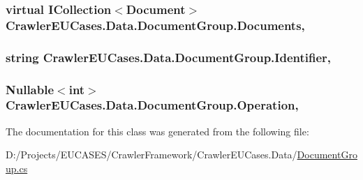 \hypertarget{class_crawler_e_u_cases_1_1_data_1_1_document_group_a02bd75a99fb88ed448675ecd5d416b0f}{
\subsubsection[{Documents}]{\setlength{\rightskip}{0pt plus 5cm}virtual I\-Collection$<${\bf Document}$>$ Crawler\-E\-U\-Cases.\-Data.\-Document\-Group.\-Documents\hspace{0.3cm}{\ttfamily [get]}, {\ttfamily [set]}}}\label{class_crawler_e_u_cases_1_1_data_1_1_document_group_a02bd75a99fb88ed448675ecd5d416b0f}
\hypertarget{class_crawler_e_u_cases_1_1_data_1_1_document_group_a5d9b0d4dc44c252ca07903c2c2b7a17b}{
\subsubsection[{Identifier}]{\setlength{\rightskip}{0pt plus 5cm}string Crawler\-E\-U\-Cases.\-Data.\-Document\-Group.\-Identifier\hspace{0.3cm}{\ttfamily [get]}, {\ttfamily [set]}}}\label{class_crawler_e_u_cases_1_1_data_1_1_document_group_a5d9b0d4dc44c252ca07903c2c2b7a17b}
\hypertarget{class_crawler_e_u_cases_1_1_data_1_1_document_group_ac9ab34aa40a740ad2fe7c29000620261}{
\subsubsection[{Operation}]{\setlength{\rightskip}{0pt plus 5cm}Nullable$<$int$>$ Crawler\-E\-U\-Cases.\-Data.\-Document\-Group.\-Operation\hspace{0.3cm}{\ttfamily [get]}, {\ttfamily [set]}}}\label{class_crawler_e_u_cases_1_1_data_1_1_document_group_ac9ab34aa40a740ad2fe7c29000620261}


The documentation for this class was generated from the following file\-:\begin{DoxyCompactItemize}
\item 
D\-:/\-Projects/\-E\-U\-C\-A\-S\-E\-S/\-Crawler\-Framework/\-Crawler\-E\-U\-Cases.\-Data/\hyperlink{_crawler_e_u_cases_8_data_2_document_group_8cs}{Document\-Group.\-cs}\end{DoxyCompactItemize}
